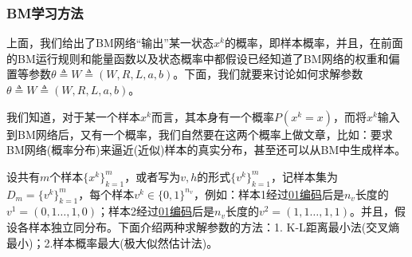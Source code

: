 {        \subsubsection{BM学习方法}
            \par
            上面，我们给出了BM网络“输出”某一状态$x^k$的概率，即样本概率，并且，在前面的BM运行规则和能量函数以及状态概率中都假设已经知道了BM网络的权重和偏置等参数$\theta \triangleq W \triangleq (W,R,L,a,b)$。下面，我们就要来讨论如何求解参数$\theta \triangleq W \triangleq (W,R,L,a,b)$。
            \par
            我们知道，对于某一个样本$x^k$而言，其本身有一个概率$P(x^k = x)$，而将$x^k$输入到BM网络后，又有一个概率，我们自然要在这两个概率上做文章，比如：要求BM网络(概率分布)来逼近(近似)样本的真实分布，甚至还可以从BM中生成样本。
            \par
            设共有$m$个样本$\{x^k\}_{k=1}^m$，或者写为$v,h$的形式$\{v^k\}_{k=1}^m$，记样本集为$D_m = \{v^k\}_{k=1}^m$，每个样本$v^k\in \{0,1\}^{n_v}$，例如：样本1经过\underline{01编码}后是$n_v$长度的$v^1 = (0,1\dots,1,0)$；样本2经过\underline{01编码}后是$n_v$长度的$v^2 = (1,1\dots,1,1)$。并且，假设各样本独立同分布。下面介绍两种求解参数的方法：1. K-L距离最小法(交叉熵最小)；2.样本概率最大(极大似然估计法)。
}
